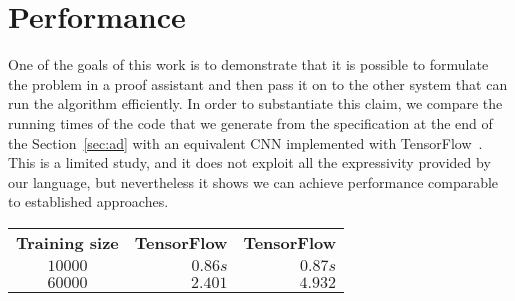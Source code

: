 \section{Performance\label{sec:performance}}

One of the goals of this work is to demonstrate that it is possible to
formulate the problem in a proof assistant and then pass it on to the
other system that can run the algorithm efficiently. In order to
substantiate this claim, we compare the running times of the code that
we generate from the specification at the end of the
Section~\ref{sec:ad} with an equivalent CNN implemented with
TensorFlow~\cite{ad-tf}. This is a limited study, and it does not
exploit all the expressivity provided by our language, but
nevertheless it shows we can achieve performance comparable to
established approaches.

\begin{table}
\begin{tabular}{crr}
\textbf{Training size} & \textbf{TensorFlow} & \textbf{TensorFlow} \\
$10000$ & $0.86s$ & $0.87s$ \\
$60000$ & $2.401$ & $4.932$
\end{tabular}
\end{table}

%




